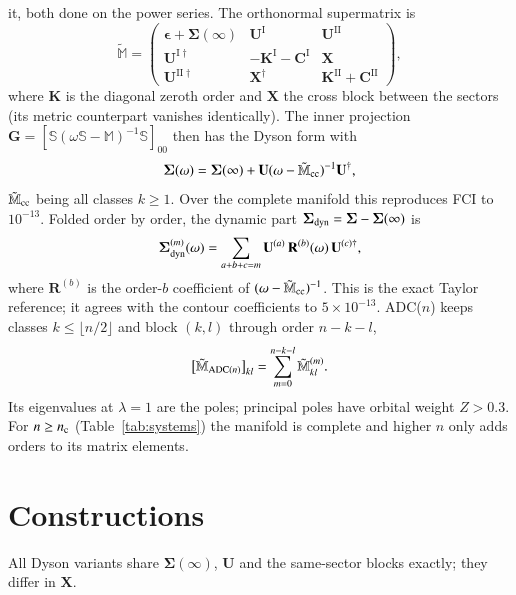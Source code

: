 \documentclass[aip,jcp,reprint,noshowkeys,superscriptaddress]{revtex4-1}
\newcommand{\eps}{\epsilon}
\newcommand{\la}{\lambda}
\newcommand{\bbM}{\mathbb{M}}
\newcommand{\bbS}{\mathbb{S}}
\newcommand{\tM}{\tilde{\mathbb{M}}}
\newcommand{\I}{\mathrm{I}}
\newcommand{\II}{\mathrm{II}}
\begin{document}
it, both done on the power series. The orthonormal supermatrix is
\begin{equation}
\tM =
\begin{pmatrix}
\bm\eps+\bm\Sigma(\infty) & \mathbf U^{\I} & \mathbf U^{\II} \\
\mathbf U^{\I\dagger} & -\mathbf K^{\I}-\mathbf C^{\I} & \mathbf X \\
\mathbf U^{\II\dagger} & \mathbf X^\dagger & \mathbf K^{\II}+\mathbf C^{\II}
\end{pmatrix} ,
\end{equation}
where $\mathbf K$ is the diagonal zeroth order and $\mathbf X$ the cross block between the sectors (its
metric counterpart vanishes identically). The inner projection\cite{tarantelli1992configuration}
$\mathbf G=[\bbS(\omega\bbS-\bbM)^{-1}\bbS]_{00}$ then has the Dyson form with
\begin{equation}
\bm\Sigma(\omega) = \bm\Sigma(\infty) + \mathbf U(\omega-\tM_{\rm cc})^{-1}\mathbf U^\dagger ,
\end{equation}
$\tM_{\rm cc}$ being all classes $k\ge1$. Over the complete manifold this reproduces FCI to $10^{-13}$.
Folded order by order, the dynamic part $\bm\Sigma_{\rm dyn}=\bm\Sigma-\bm\Sigma(\infty)$ is
\begin{equation}
\bm\Sigma^{(m)}_{\rm dyn}(\omega) = \sum_{a+b+c=m}\mathbf U^{(a)}\,\mathbf R^{(b)}(\omega)\,\mathbf U^{(c)\dagger} ,
\end{equation}
where $\mathbf R^{(b)}$ is the order-$b$ coefficient of $(\omega-\tM_{\rm cc})^{-1}$. This is the exact
Taylor reference; it agrees with the contour coefficients to $5\times10^{-13}$. ADC($n$)\cite{Schirmer_1982,Schirmer_1983}
keeps classes $k\le\lfloor n/2\rfloor$ and block $(k,l)$ through order $n-k-l$,
\begin{equation}
\big[\tM_{{\rm ADC}(n)}\big]_{kl} = \sum_{m=0}^{n-k-l}\tM^{(m)}_{kl} .
\label{eq:rule}
\end{equation}
Its eigenvalues at $\la=1$ are the poles; principal poles have orbital weight $Z>0.3$. For $n\ge n_{\rm c}$
(Table~\ref{tab:systems}) the manifold is complete and higher $n$ only adds orders to its matrix elements.

\section{Constructions}

All Dyson variants share $\bm\Sigma(\infty)$, $\mathbf U$ and the same-sector blocks exactly; they differ in
$\mathbf X$.
\end{document}
